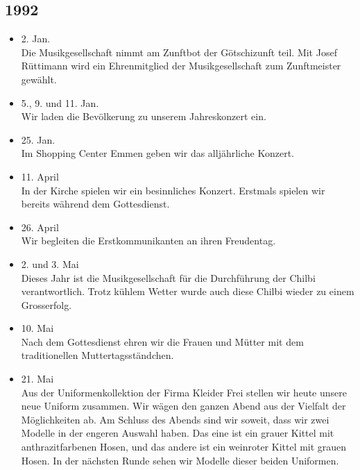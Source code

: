 \subsection{1992}

\begin{history}


    \begin{itemize}

        \item 2. Jan.\\
              Die Musikgesellschaft nimmt am Zunftbot der Götschizunft teil. Mit Josef
              Rüttimann wird ein Ehrenmitglied der Musikgesellschaft zum Zunftmeister
              gewählt.

        \item 5., 9. und 11. Jan.\\
              Wir laden die Bevölkerung zu unserem Jahreskonzert ein.

        \item 25. Jan.\\
              Im Shopping Center Emmen geben wir das alljährliche Konzert.

        \item 11. April\\
              In der Kirche spielen wir ein besinnliches Konzert. Erstmals spielen wir
              bereits während dem Gottesdienst.

        \item 26. April\\
              Wir begleiten die Erstkommunikanten an ihren Freudentag.

        \item 2. und 3. Mai\\
              Dieses Jahr ist die Musikgesellschaft für die Durchführung der Chilbi
              verantwortlich. Trotz kühlem Wetter wurde auch diese Chilbi wieder zu
              einem Grosserfolg.

        \item 10. Mai\\
              Nach dem Gottesdienst ehren wir die Frauen und Mütter mit dem
              traditionellen Muttertagsständchen.

        \item 21. Mai\\
              Aus der Uniformenkollektion der Firma Kleider Frei stellen wir heute
              unsere neue Uniform zusammen. Wir wägen den ganzen Abend aus der
              Vielfalt der Möglichkeiten ab. Am Schluss des Abends sind wir soweit,
              dass wir zwei Modelle in der engeren Auswahl haben. Das eine ist ein
              grauer Kittel mit anthrazitfarbenen Hosen, und das andere ist ein
              weinroter Kittel mit grauen Hosen. In der nächsten Runde sehen wir
              Modelle dieser beiden Uniformen.


\end{itemize}
\end{history}
